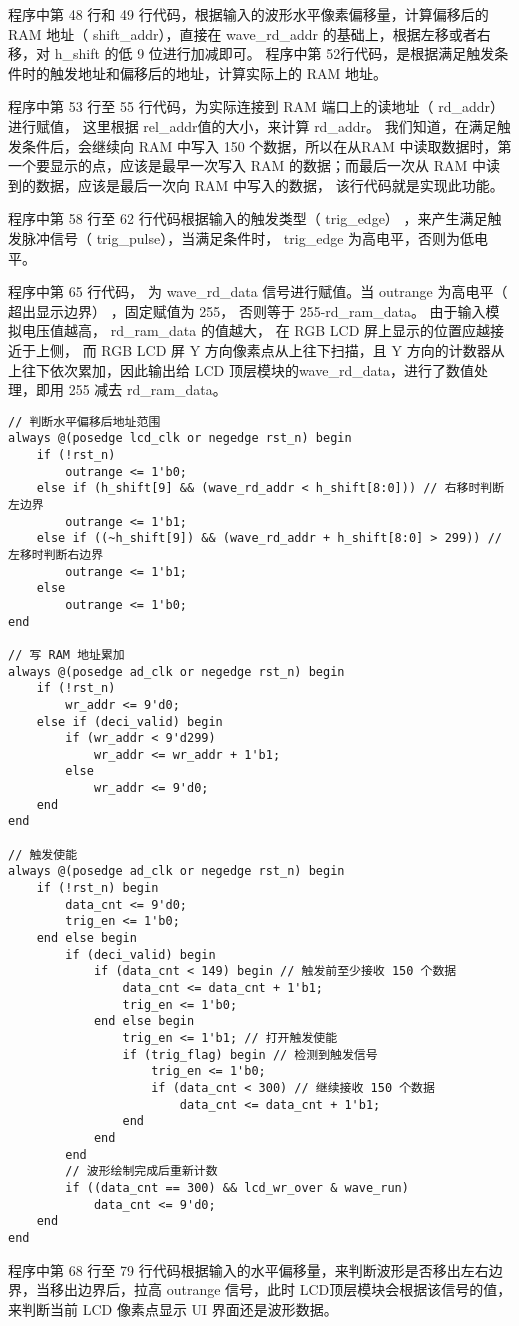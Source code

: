 \documentclass[lang=cn,a4paper,newtx]{elegantpaper}
\begin{document}
程序中第 48 行和 49 行代码，根据输入的波形水平像素偏移量，计算偏移后的 RAM 地址（ shift\_addr），直接在 wave\_rd\_addr 的基础上，根据左移或者右移，对 h\_shift 的低 9 位进行加减即可。
程序中第 52行代码，是根据满足触发条件时的触发地址和偏移后的地址，计算实际上的 RAM 地址。

程序中第 53 行至 55 行代码，为实际连接到 RAM 端口上的读地址（ rd\_addr）进行赋值， 这里根据 rel\_addr值的大小，来计算 rd\_addr。 我们知道，在满足触发条件后，会继续向 RAM 中写入 150 个数据，所以在从RAM 中读取数据时，第一个要显示的点，应该是最早一次写入 RAM 的数据；而最后一次从 RAM 中读到的数据，应该是最后一次向 RAM 中写入的数据， 该行代码就是实现此功能。

程序中第 58 行至 62 行代码根据输入的触发类型（ trig\_edge） ，来产生满足触发脉冲信号（ trig\_pulse），当满足条件时， trig\_edge 为高电平，否则为低电平。

程序中第 65 行代码， 为 wave\_rd\_data 信号进行赋值。当 outrange 为高电平（ 超出显示边界） ，固定赋值为 255， 否则等于 255-rd\_ram\_data。 由于输入模拟电压值越高， rd\_ram\_data 的值越大， 在 RGB LCD 屏上显示的位置应越接近于上侧， 而 RGB LCD 屏 Y 方向像素点从上往下扫描，且 Y 方向的计数器从上往下依次累加，因此输出给 LCD 顶层模块的wave\_rd\_data，进行了数值处理，即用 255 减去 rd\_ram\_data。
\begin{lstlisting}[firstnumber=67]
// 判断水平偏移后地址范围
always @(posedge lcd_clk or negedge rst_n) begin
    if (!rst_n)
        outrange <= 1'b0;
    else if (h_shift[9] && (wave_rd_addr < h_shift[8:0])) // 右移时判断左边界
        outrange <= 1'b1;
    else if ((~h_shift[9]) && (wave_rd_addr + h_shift[8:0] > 299)) // 左移时判断右边界
        outrange <= 1'b1;
    else
        outrange <= 1'b0;
end

// 写 RAM 地址累加
always @(posedge ad_clk or negedge rst_n) begin
    if (!rst_n)
        wr_addr <= 9'd0;
    else if (deci_valid) begin
        if (wr_addr < 9'd299)
            wr_addr <= wr_addr + 1'b1;
        else
            wr_addr <= 9'd0;
    end
end

// 触发使能
always @(posedge ad_clk or negedge rst_n) begin
    if (!rst_n) begin
        data_cnt <= 9'd0;
        trig_en <= 1'b0;
    end else begin
        if (deci_valid) begin
            if (data_cnt < 149) begin // 触发前至少接收 150 个数据
                data_cnt <= data_cnt + 1'b1;
                trig_en <= 1'b0;
            end else begin
                trig_en <= 1'b1; // 打开触发使能
                if (trig_flag) begin // 检测到触发信号
                    trig_en <= 1'b0;
                    if (data_cnt < 300) // 继续接收 150 个数据
                        data_cnt <= data_cnt + 1'b1;
                end
            end
        end
        // 波形绘制完成后重新计数
        if ((data_cnt == 300) && lcd_wr_over & wave_run)
            data_cnt <= 9'd0;
    end
end

\end{lstlisting}
程序中第 68 行至 79 行代码根据输入的水平偏移量，来判断波形是否移出左右边界，当移出边界后，拉高 outrange 信号，此时 LCD顶层模块会根据该信号的值，来判断当前 LCD 像素点显示 UI 界面还是波形数据。
\end{document}
